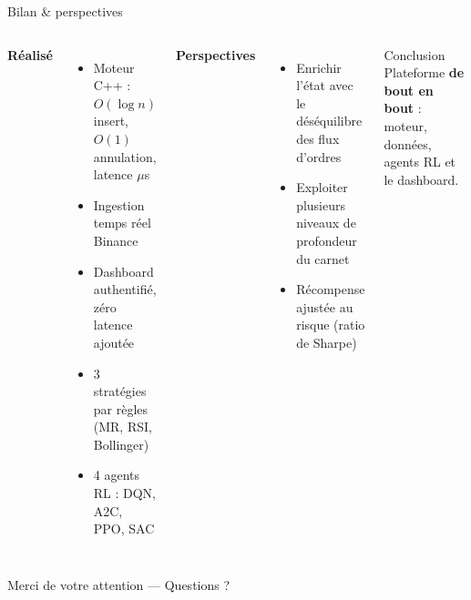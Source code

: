 \documentclass[11pt,aspectratio=169]{beamer}
\begin{document}
\begin{frame}{Bilan \& perspectives}
    \begin{columns}[T]
        \textbf{\color{bidgreen}Réalisé}
        \begin{itemize}
            \item Moteur C++ : $O(\log n)$ insert, $O(1)$ annulation, latence \alert{$\mu$s}
            \item Ingestion temps réel Binance
            \item \alert{Dashboard} authentifié, zéro latence ajoutée
            \item 3 stratégies par règles (MR, RSI, Bollinger)
            \item 4 agents RL : DQN, A2C, PPO, \alert{SAC}
        \end{itemize}

        \textbf{\color{enseirbaccent}Perspectives}
        \begin{itemize}
            \item Enrichir l'état avec le déséquilibre des flux d'ordres
            \item Exploiter plusieurs niveaux de profondeur du carnet
            \item Récompense ajustée au risque (ratio de Sharpe)
        \end{itemize}

        \vspace{0.4cm}
        \begin{block}{Conclusion}
            \footnotesize
            Plateforme \textbf{de bout en bout} : moteur, données, agents RL et le dashboard.
        \end{block}
    \end{columns}

    \vspace{0.3cm}
    \begin{center}
        \Large \alert{Merci de votre attention --- Questions ?}
    \end{center}
\end{frame}
\end{document}
